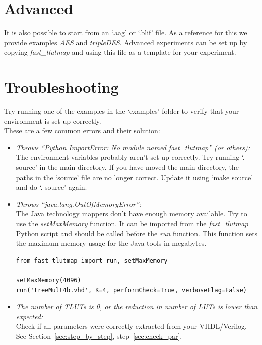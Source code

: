 \documentclass[a4paper,oneside]{memoir}
\begin{document}
\section{Advanced}
It is also possible to start from an `.aag' or `.blif' file. As a reference for this we provide examples \emph{AES} and \emph{tripleDES}. 
Advanced experiments can be set up by copying \emph{fast\_tlutmap} and using this file as a template for your experiment.

\section{Troubleshooting}\label{sec:tlut_troubleshooting}
Try running one of the examples in the `examples' folder to verify that your environment is set up correctly.\\

These are a few common errors and their solution:
\begin{itemize}
\item \emph{Throws ``Python ImportError: No module named fast\_tlutmap'' (or others):}\\
The environment variables probably aren't set up correctly. Try running `. source' in the main directory. 
If you have moved the main directory, the paths in the `source' file are no longer correct. Update it using `make source' and do `. source' again.

\item \emph{Throws ``java.lang.OutOfMemoryError'':}\\
The Java technology mappers don't have enough memory available. Try to use the \emph{setMaxMemory} function. It can be imported from the \emph{fast\_tlutmap} Python script and should be called before the \emph{run} function. This function sets the maximum memory usage for the Java tools in megabytes.
\lstset{language=python}
\begin{lstlisting}
from fast_tlutmap import run, setMaxMemory

setMaxMemory(4096)
run('treeMult4b.vhd', K=4, performCheck=True, verboseFlag=False)
\end{lstlisting}

\item \emph{The number of TLUTs is 0, or the reduction in number of LUTs is lower than expected:}\\
Check if all parameters were correctly extracted from your VHDL/Verilog. See Section~\ref{sec:step_by_step}, step~\ref{sec:check_par}.
\end{itemize}
\end{document}
